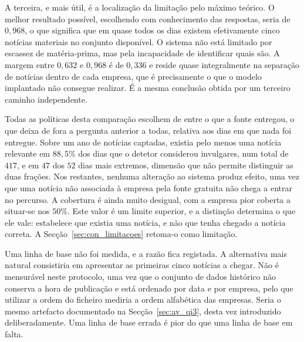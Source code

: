 A terceira, e mais útil, é a localização da limitação pelo máximo teórico. O melhor resultado
possível, escolhendo com conhecimento das respostas, seria de $0{,}968$, o que significa que em quase
todos os dias existem efetivamente cinco notícias materiais no conjunto disponível. O sistema não
está limitado por escassez de matéria-prima, mas pela incapacidade de identificar quais são. A margem
entre $0{,}632$ e $0{,}968$ é de $0{,}336$ e reside quase integralmente na separação de notícias
dentro de cada empresa, que é precisamente o que o modelo implantado não consegue realizar. É a mesma
conclusão obtida por um terceiro caminho independente.

Todas as políticas desta comparação escolhem de entre o que a fonte entregou, o que deixa de fora a
pergunta anterior a todas, relativa aos dias em que nada foi entregue. Sobre um ano de notícias
captadas, existia pelo menos uma notícia relevante em $88{,}5\%$ dos dias que o detetor considerou
invulgares, num total de $417$, e em $47$ dos $52$ dias mais extremos, dimensão que não permite
distinguir as duas frações. Nos restantes, nenhuma alteração ao sistema produz
efeito, uma vez que uma notícia não associada à empresa pela fonte gratuita não chega a entrar no
percurso. A cobertura é ainda muito desigual, com a empresa pior coberta a situar-se nos $50\%$. Este
valor é um limite superior, e a distinção determina o que ele vale: estabelece que existia uma
notícia, e não que tenha chegado a notícia correta. A Secção~\ref{sec:con_limitacoes} retoma-o como
limitação.

Uma linha de base não foi medida, e a razão fica registada. A alternativa mais natural consistiria em
apresentar as primeiras cinco notícias a chegar. Não é mensurável neste protocolo, uma vez que o
conjunto de dados histórico não conserva a hora de publicação e está ordenado por data e por empresa,
pelo que utilizar a ordem do ficheiro mediria a ordem alfabética das empresas. Seria o mesmo
artefacto documentado na Secção~\ref{sec:av_qi3}, desta vez introduzido deliberadamente. Uma linha de
base errada é pior do que uma linha de base em falta.



